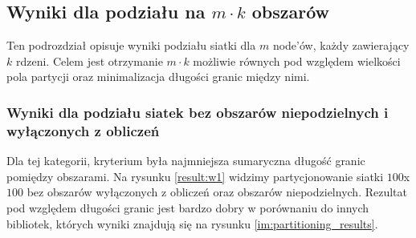 \subsection{Wyniki dla podziału na $m \cdot k$ obszarów}
Ten podrozdział opisuje wyniki podziału siatki dla $m$ node'ów, każdy zawierający $k$ rdzeni.
Celem jest otrzymanie $m \cdot k$ możliwie równych pod względem wielkości pola partycji oraz minimalizacja długości granic
między nimi.
\vspace{5mm}
\subsubsection{Wyniki dla podziału siatek bez obszarów niepodzielnych i wyłączonych z obliczeń}
Dla tej kategorii, kryterium była najmniejsza sumaryczna długość granic pomiędzy obszarami.
Na rysunku \ref{result:w1} widzimy partycjonowanie siatki $100$x$100$ bez obszarów wyłączonych z obliczeń oraz
obszarów niepodzielnych.
Rezultat pod względem długości granic jest bardzo dobry w porównaniu do innych bibliotek, których wyniki znajdują się na rysunku
\ref{im:partitioning_results}.
